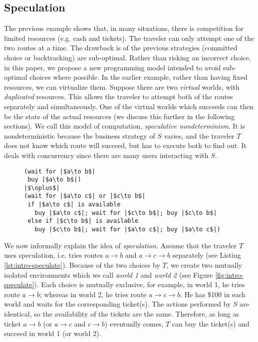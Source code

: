 \subsection{Speculation}
The previous example shows that, in many situations,
there is competition for limited resources (e.g. cash and tickets). 
The traveler can only 
attempt one of the two routes at a time. 
The drawback is of the previous strategies (committed choice or 
backtracking) are sub-optimal.
Rather than risking an incorrect choice, in this paper, we propose
a new programming model intended to avoid sub-optimal choices where possible.
In the earlier example, rather than having fixed resources, we can virtualize
them. Suppose
there are two {\em virtual} worlds, with {\em duplicated} resources.
This allows the traveler to attempt both of the routes separately and simultaneously.
One of the virtual worlds which succeeds can then be the state of the
actual resources (we discuss this further in the following sections).
We call this model of computation, {\em speculative nondeterminism}. 
It is nondeterministic because the business strategy of $S$ varies, and the traveler $T$
does not know which route will succeed, but has to execute both to find out.
It deals with concurrency since there are many users interacting with $S$.


\begin{figure}[tb]
\begin{lstlisting}[caption=Speculation. $\oplus$ denotes an exclusive choice construct.,label=lst:intro-speculate]
(wait for |$a\to b$|
 buy |$a\to b$|)
|$\oplus$|
(wait for |$a\to c$| or |$c\to b$|
 if |$a\to c$| is available
   buy |$a\to c$|; wait for |$c\to b$|; buy |$c\to b$|
 else if |$c\to b$| is available
   buy |$c\to b$|; wait for |$a\to c$|; buy |$a\to c$|)
\end{lstlisting}
\end{figure}

We now informally explain the idea of {\em speculation}.
Assume that the traveler $T$ uses speculation, i.e.
tries routes $a\to b$ and $a\to c\to b$ separately 
(see Listing \ref{lst:intro-speculate}). 
Because of the two choices by $T$, 
we create two mutually isolated environments which we call
{\em world 1} and {\em world 2} (see Figure \ref{fig:intro-speculate}). 
Each choice is mutually exclusive, for example,
in world 1, he tries route $a\to b$; whereas
in world 2, he tries route $a\to c\to b$. 
He has \$100 in each world and waits for the corresponding ticket(s).
The actions performed by $S$ are identical, so the availability of the tickets are the same.
Therefore, as long as ticket $a\to b$ (or $a\to c$ and $c\to b$) eventually comes,
$T$ can buy the ticket(s) and succeed in world 1 (or world 2).

